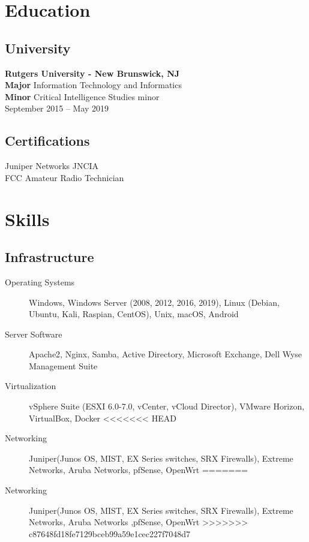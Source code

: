 \documentclass{article}
\begin{document}
\begin{samepage}
\section{Education}
\noindent%
\begin{minipage}[t]{.55\textwidth}
	\subsection*{University}
	\textbf{Rutgers University - New Brunswick, NJ} \\
	\textbf{Major} Information Technology and Informatics \\
	\textbf{Minor} Critical Intelligence Studies minor \\
	September 2015 -- May 2019
\end{minipage}%
\hfill
\begin{minipage}[t]{.35\textwidth}
	\subsection*{Certifications}
	Juniper Networks JNCIA \\
	FCC Amateur Radio Technician
\end{minipage}%

\section{Skills}

\subsection{Infrastructure}
\begin{description}
\item[Operating Systems] Windows, Windows Server (2008, 2012, 2016, 2019), Linux (Debian, Ubuntu, Kali, Raspian, CentOS), Unix,  macOS, Android
\item[Server Software] Apache2, Nginx, Samba, Active Directory, Microsoft Exchange, Dell Wyse Management Suite
\item[Virtualization] vSphere Suite (ESXI 6.0-7.0, vCenter, vCloud Director), VMware Horizon, VirtualBox, Docker
<<<<<<< HEAD
\item[Networking] Juniper(Junos OS, MIST, EX Series switches, SRX Firewalls), Extreme Networks, Aruba Networks, pfSense, OpenWrt
=======
\item[Networking] Juniper(Junos OS, MIST, EX Series switches, SRX Firewalls), Extreme Networks, Aruba Networks ,pfSense, OpenWrt
>>>>>>> c87648fd18fe7129bceb99a59e1cec227f7048d7
\end{description}


\end{samepage}
\end{document}
